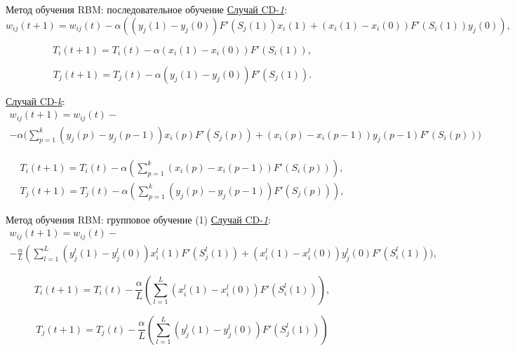 \documentclass[10pt]{beamer}
\begin{document}
        \begin{frame}{Метод обучения RBM: последовательное обучение}
            \underline{Случай CD-\textit{1}}:
            \begin{equation*}
                w_{ij}(t+1)=w_{ij}(t)-\alpha((y_j(1)-y_j(0))F'(S_j(1))x_i(1)+(x_i(1)-x_i(0))F'(S_i(1))y_j(0)),
            \end{equation*}

            \begin{equation*}
                T_i(t+1)=T_i(t)-\alpha(x_i(1)-x_i(0))F'(S_i(1)),
            \end{equation*}

            \begin{equation*}
                T_j(t+1)=T_j(t)-\alpha(y_j(1)-y_j(0))F'(S_j(1)).  
            \end{equation*}
            
            \underline{Случай CD-\textit{k}}:
            \begin{multline*}
                w_{ij}(t+1)=w_{ij}(t)-\\-\alpha\Bigg(\sum_{p=1}^k (y_j(p)-y_j(p-1))x_i(p)F'(S_j(p))+(x_i(p)-x_i(p-1))y_j(p-1)F'(S_i(p))\Bigg)
            \end{multline*}

            \begin{equation*}
            \begin{aligned}
                T_i(t+1)=T_i(t)-\alpha\left(\sum_{p=1}^k (x_i(p)-x_i(p-1))F'(S_i(p))\right),\\
                T_j(t+1)=T_j(t)-\alpha\left(\sum_{p=1}^k (y_j(p)-y_j(p-1))F'(S_j(p))\right),
            \end{aligned}
            \end{equation*}
        \end{frame}

        \begin{frame}{Метод обучения RBM: групповое обучение (1)}
            \underline{Случай CD-\textit{1}}:
            \begin{multline*}
                w_{ij}(t+1)=w_{ij}(t)-\\-\frac{\alpha}{L}\left(\sum_{l=1}^L (y_j^l(1)-y_j^l(0))x_i^l(1)F'(S_j^l(1))+(x_i^l(1)-x_i^l(0))y_j^l(0)F'(S_i^l(1))\Bigg)\right.,
            \end{multline*}

            \begin{equation*}
                T_i(t+1)=T_i(t)-\frac{\alpha}{L}\left(\sum_{l=1}^L (x_i^l(1)-x_i^l(0))F'(S_i^l(1))\right),
            \end{equation*}

            \begin{equation*}
                T_j(t+1)=T_j(t)-\frac{\alpha}{L}\left(\sum_{l=1}^L (y_j^l(1)-y_j^l(0))F'(S_j^l(1))\right)
            \end{equation*}
        \end{frame}
\end{document}
